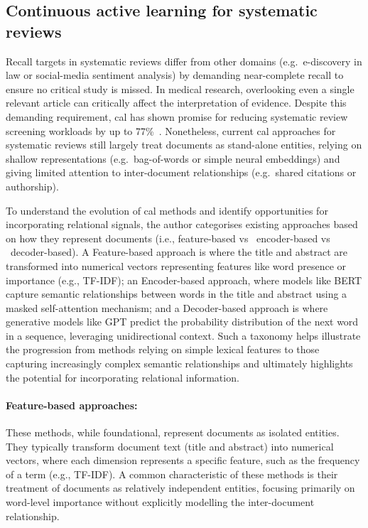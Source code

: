 \documentclass[10pt,oneside]{book}
\begin{document}
\subsection{Continuous active learning for systematic reviews}

Recall targets in systematic reviews differ from other domains (e.g.\ e-discovery in law or social-media sentiment analysis) by demanding near-complete recall to ensure no critical study is missed. In medical research, overlooking even a single relevant article can critically affect the interpretation of evidence. Despite this demanding requirement, \gls*{cal} has shown promise for reducing systematic review screening workloads by up to 77\%~\cite{van_der_vet_propagation_2016}. Nonetheless, current \gls*{cal} approaches for systematic reviews still largely treat documents as stand-alone entities, relying on shallow representations (e.g.\ bag-of-words or simple neural embeddings) and giving limited attention to inter-document relationships (e.g.\ shared citations or authorship).

To understand the evolution of \gls*{cal} methods and identify opportunities for incorporating relational signals, the author categorises existing approaches based on how they represent documents (i.e., feature-based vs \ encoder-based vs \ decoder-based). A Feature-based approach is where the title and abstract are transformed into numerical vectors representing features like word presence or importance (e.g., TF-IDF); an Encoder-based approach, where models like BERT capture semantic relationships between words in the title and abstract using a masked self-attention mechanism; and a Decoder-based approach is where generative models like GPT predict the probability distribution of the next word in a sequence, leveraging unidirectional context. Such a taxonomy helps illustrate the progression from methods relying on simple lexical features to those capturing increasingly complex semantic relationships and ultimately highlights the potential for incorporating relational information.

\paragraph{Feature-based approaches: }

These methods, while foundational, represent documents as isolated entities. They typically transform document text (title and abstract) into numerical vectors, where each dimension represents a specific feature, such as the frequency of a term (e.g., TF-IDF). A common characteristic of these methods is their treatment of documents as relatively independent entities, focusing primarily on word-level importance without explicitly modelling the inter-document relationship.
\end{document}
